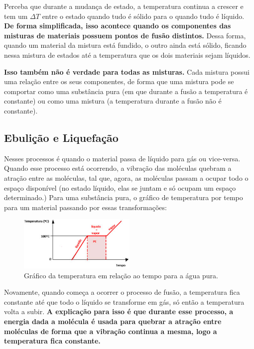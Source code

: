 \documentclass[12pt]{extarticle}
\newcommand{\<}{\langle}
\renewcommand{\>}{\rangle}
\theoremstyle{definition}
\begin{document}
Perceba que durante a mudança de estado, a temperatura continua a crescer e tem um $\Delta T$ entre o estado quando tudo é sólido para o quando tudo é líquido. \textbf{De forma simplificada, isso acontece quando os componentes das misturas de materiais possuem pontos de fusão distintos.} Dessa forma, quando um material da mistura está fundido, o outro ainda está sólido, ficando nessa mistura de estados até a temperatura que os dois materiais sejam líquidos.

\textbf{Isso também não é verdade para todas as misturas.} Cada mistura possui uma relação entre os seus componentes, de forma que uma mistura pode se comportar como uma substância pura (em que durante a fusão a temperatura é constante) ou como uma mistura (a temperatura durante a fusão não é constante).

\subsection{Ebulição e Liquefação}

Nesses processos é quando o material passa de líquido para gás ou vice-versa. Quando esse processo está ocorrendo, a vibração das moléculas quebram a atração entre as moléculas, tal que, agora, as moléculas passam a ocupar todo o espaço disponível (no estado líquido, elas se juntam e só ocupam um espaço determinado.) Para uma substância pura, o gráfico de temperatura por tempo para um material passando por essas transformações:

\begin{figure}[h]
    \centering
    \includegraphics[width=0.5\textwidth]{gradico-do-ponto-de-ebulicao.jpg}
    \caption{Gráfico da temperatura em relação ao tempo para a água pura.}
    \label{fig:my_label}
\end{figure}

Novamente, quando começa a ocorrer o processo de fusão, a temperatura fica constante até que todo o líquido se transforme em gás, só então a temperatura volta a subir. \textbf{A explicação para isso é que durante esse processo, a energia dada a molécula é usada para quebrar a atração entre moléculas de forma que a vibração continua a mesma, logo a temperatura fica constante.}
\end{document}
